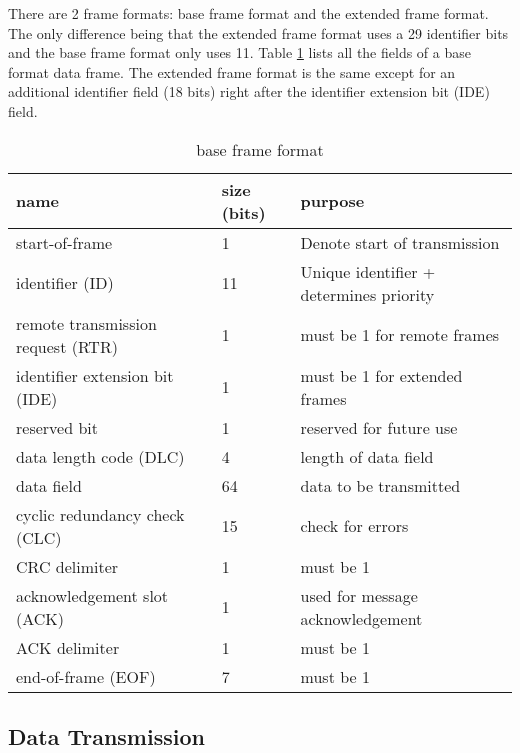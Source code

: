 There are 2 frame formats: base frame format and the extended frame format. The only difference being that the extended frame format uses a 29 identifier bits and the base frame format only uses 11. Table \ref{table:1} lists all the fields of a base format data frame. The extended frame format is the same except for an additional identifier field (18 bits) right after the identifier extension bit (IDE) field.

\begin{table}[]
	\begin{tabular}{|l|l|l|}
		\hline
		\rowcolor[HTML]{9B9B9B} 
		name & size (bits) & purpose \\ \hline
		start-of-frame & 1 & Denote start of transmission \\ \hline
		identifier (ID) & 11 & Unique identifier + determines priority \\ \hline
		remote transmission request (RTR) & 1 & must be 1 for remote frames \\ \hline
		identifier extension bit (IDE) & 1 & must be 1 for extended frames \\ \hline
		reserved bit & 1 & reserved for future use \\ \hline
		data length code (DLC) & 4 & length of data field \\ \hline
		data field & 64 & data to be transmitted \\ \hline
		cyclic redundancy check (CLC) & 15 & check for errors \footnotemark  \\ \hline
		CRC delimiter & 1 &  must be 1 \\ \hline
		acknowledgement slot (ACK) & 1 & used for message acknowledgement \\ \hline
		ACK delimiter & 1 & must be 1 \\ \hline
		end-of-frame (EOF) & 7 & must be 1  \\ \hline
	\end{tabular}
	\caption{base frame format \cite{wiki:CAN}}
	\label{table:1}
\end{table}


\subsection{Data Transmission}
\label{subsec:can:data_transmission}

